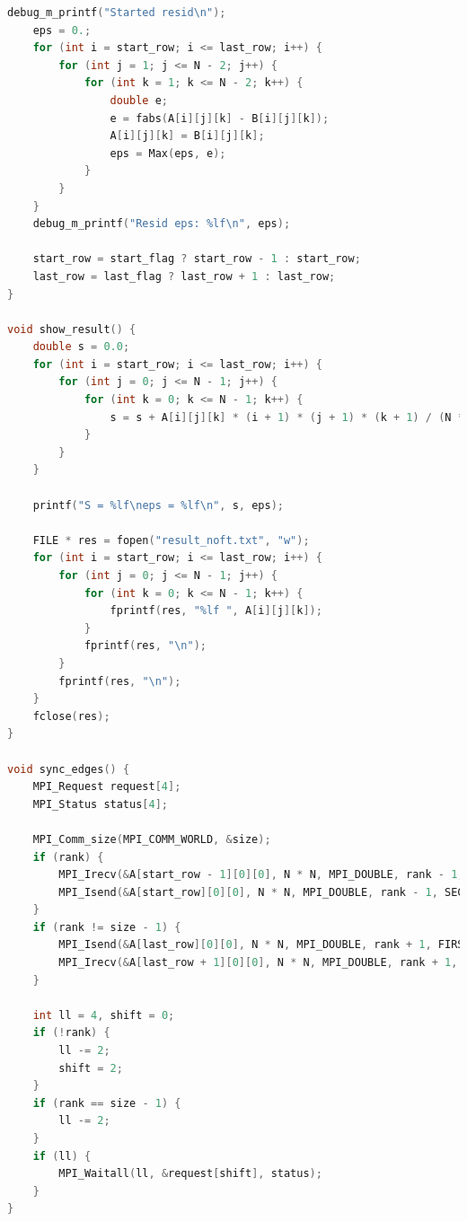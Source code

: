 \documentclass[a4paper]{article}
\begin{document}
\begin{lstlisting}[caption=jac\_3d\_mpi\_noft.c, label={lst:3}, language=C]
    debug_m_printf("Started resid\n");
    eps = 0.;
    for (int i = start_row; i <= last_row; i++) {
        for (int j = 1; j <= N - 2; j++) {
            for (int k = 1; k <= N - 2; k++) {
                double e;
                e = fabs(A[i][j][k] - B[i][j][k]);
                A[i][j][k] = B[i][j][k];
                eps = Max(eps, e);
            }
        }
    }
    debug_m_printf("Resid eps: %lf\n", eps);

    start_row = start_flag ? start_row - 1 : start_row;
    last_row = last_flag ? last_row + 1 : last_row;
}

void show_result() {
    double s = 0.0;
    for (int i = start_row; i <= last_row; i++) {
        for (int j = 0; j <= N - 1; j++) {
            for (int k = 0; k <= N - 1; k++) {
                s = s + A[i][j][k] * (i + 1) * (j + 1) * (k + 1) / (N * N * N);
            }
        }
    }

    printf("S = %lf\neps = %lf\n", s, eps);

    FILE * res = fopen("result_noft.txt", "w");
    for (int i = start_row; i <= last_row; i++) {
        for (int j = 0; j <= N - 1; j++) {
            for (int k = 0; k <= N - 1; k++) {
                fprintf(res, "%lf ", A[i][j][k]);
            }
            fprintf(res, "\n");
        }
        fprintf(res, "\n");
    }
    fclose(res);
}

void sync_edges() {
    MPI_Request request[4];
    MPI_Status status[4];

    MPI_Comm_size(MPI_COMM_WORLD, &size);
    if (rank) {
        MPI_Irecv(&A[start_row - 1][0][0], N * N, MPI_DOUBLE, rank - 1, FIRST_SYNC_TAG, MPI_COMM_WORLD, &request[0]);
        MPI_Isend(&A[start_row][0][0], N * N, MPI_DOUBLE, rank - 1, SECOND_SYNC_TAG, MPI_COMM_WORLD, &request[1]);
    }
    if (rank != size - 1) {
        MPI_Isend(&A[last_row][0][0], N * N, MPI_DOUBLE, rank + 1, FIRST_SYNC_TAG, MPI_COMM_WORLD, &request[2]);
        MPI_Irecv(&A[last_row + 1][0][0], N * N, MPI_DOUBLE, rank + 1, SECOND_SYNC_TAG, MPI_COMM_WORLD, &request[3]);
    }

    int ll = 4, shift = 0;
    if (!rank) {
        ll -= 2;
        shift = 2;
    }
    if (rank == size - 1) {
        ll -= 2;
    }
    if (ll) {
        MPI_Waitall(ll, &request[shift], status);
    }
}

\end{lstlisting}
\end{document}
